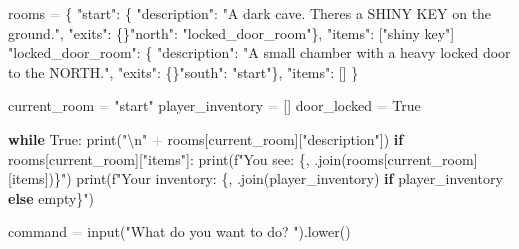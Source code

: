 \documentclass[
  justified,
  openright,
]{tufte-book}
\newcommand{\KeywordTok}[1]{\textcolor{CodeKeyword}{\textbf{#1}}}  %
\newcommand{\StringTok}[1]{\textcolor{CodeString}{#1}}              %
\newcommand{\OperatorTok}[1]{\textcolor{DarkGray}{#1}}              %
\newenvironment{Shaded}{%
  \begin{mdframed}[style=TufteCode]%
}{%
  \end{mdframed}%
}
\begin{document}
\begin{Shaded}
\begin{Highlighting}[]
rooms \OperatorTok{=} \{
    \StringTok{"start"}: \{
        \StringTok{"description"}: \StringTok{"A dark cave. There\textquotesingle{}s a SHINY KEY on the ground."},
        \StringTok{"exits"}: \{\}\StringTok{"north"}: \StringTok{"locked\_door\_room"}\},
        \StringTok{"items"}: [\StringTok{"shiny key"}]
    \,
    \StringTok{"locked\_door\_room"}: \{
        \StringTok{"description"}: \StringTok{"A small chamber with a heavy locked door to the NORTH."},
        \StringTok{"exits"}: \{\}\StringTok{"south"}: \StringTok{"start"}\},
        \StringTok{"items"}: []
    \}
\
 
current\_room \OperatorTok{=} \StringTok{"start"}
player\_inventory \OperatorTok{=} []
door\_locked \OperatorTok{=} True
 
\KeywordTok{while} True:
    print(\StringTok{"}\StringTok{\textbackslash{}n}\StringTok{"} \OperatorTok{+} rooms[current\_room][\StringTok{"description"}])
    \KeywordTok{if} rooms[current\_room][\StringTok{"items"}]:
        print(\StringTok{f"You see: }\StringTok{\{}\StringTok{\textquotesingle{}, \textquotesingle{}}\StringTok{.}join(rooms[current\_room][\StringTok{\textquotesingle{}items\textquotesingle{}}])\StringTok{\}}\StringTok{"})
    print(\StringTok{f"Your inventory: }\StringTok{\{}\StringTok{\textquotesingle{}, \textquotesingle{}}\StringTok{.}join(player\_inventory) \KeywordTok{if} player\_inventory \KeywordTok{else} \StringTok{\textquotesingle{}empty\textquotesingle{}}\StringTok{\}}\StringTok{"})
 
    command \OperatorTok{=} input(\StringTok{"What do you want to do? "}).lower()
 

\end{Highlighting}
\end{Shaded}
\end{document}
